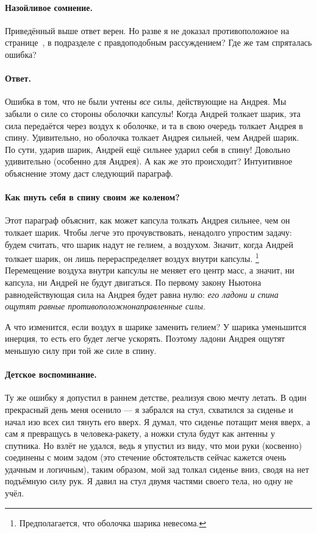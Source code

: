 \paragraph{Назойливое сомнение.}
Приведённый выше ответ верен.
Но разве я не доказал противоположное на странице~\pageref{Правдоподобное рассуждение}, в подразделе с правдоподобным рассуждением?
Где же там спряталась ошибка?

\paragraph{Ответ.}
Ошибка в том, что не были учтены \emph{все} силы, действующие на Андрея.
Мы забыли о силе со стороны оболочки капсулы!
Когда Андрей толкает шарик, эта сила передаётся через воздух к оболочке, и та в свою очередь толкает Андрея в спину.
Удивительно, но оболочка толкает Андрея сильней, чем Андрей шарик.
По сути, ударив шарик, Андрей ещё сильнее ударил себя в спину!
Довольно удивительно (особенно для Андрея).
А как же это происходит?
Интуитивное объяснение этому даст следующий параграф.

\paragraph{Как пнуть себя в спину своим же коленом?}
Этот параграф объяснит, как может капсула толкать Андрея сильнее, чем он толкает шарик.
Чтобы легче это прочувствовать, ненадолго упростим задачу:
будем считать, что шарик надут не гелием, а воздухом.
Значит, когда Андрей толкает шарик, он лишь перераспределяет воздух внутри капсулы.%
\footnote{Предполагается, что оболочка шарика невесома.}
Перемещение воздуха внутри капсулы не меняет его центр масс, а значит, ни капсула, ни Андрей не будут двигаться.
По первому закону Ньютона равнодействующая сила на Андрея будет равна нулю: \emph{его ладони и спина ощутят равные противоположнонаправленные силы}.

А что изменится, если воздух в шарике заменить гелием?
У шарика уменьшится инерция, то есть его будет легче ускорять.
Поэтому ладони Андрея ощутят меньшую силу при той же силе в спину.

\paragraph{Детское воспоминание.}
Ту же ошибку я допустил в раннем детстве, реализуя свою мечту летать.
В один прекрасный день меня осенило --- я забрался на стул, схватился за сиденье и начал изо всех сил тянуть его вверх.
Я думал, что сиденье потащит меня вверх, а сам я превращусь в человека-ракету, а ножки стула будут как антенны у спутника.
Но взлёт не удался, ведь я упустил из виду, что мои руки (косвенно) соединены с моим задом
(это стечение обстоятельств сейчас кажется очень удачным и логичным),
таким образом, мой зад толкал сиденье вниз, сводя на нет подъёмную силу рук.
Я давил на стул двумя частями своего тела, но одну не учёл.

